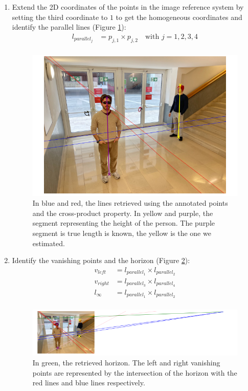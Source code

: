 \begin{enumerate}
    
    \item Extend the 2D coordinates of the points in the image reference system by setting the third coordinate to $1$ to get the homogeneous coordinates and identify the parallel lines (Figure \ref{fig:retrieved_lines}):
    \begin{align*}
        l_{parallel_j} &= p_{j,1} \times p_{j,2} \quad \text{with }j=1,2,3,4\\
    \end{align*}

\begin{figure}
    \centering
    \includegraphics[width=0.5\linewidth]{img/retrieved_lines.png}
    \caption{In blue and red, the lines retrieved using the annotated points and the cross-product property. In yellow and purple, the segment representing the height of the person. The purple segment is true length is known, the yellow is the one we estimated.}
    \label{fig:retrieved_lines}
\end{figure}
    
    \item Identify the vanishing points and the horizon (Figure \ref{fig:wide}):
    \begin{align*}
        v_{left} &= l_{parallel_1} \times l_{parallel_2}\\
        v_{right} &= l_{parallel_3} \times l_{parallel_4}\\
        l_{\infty} &= l_{parallel_1} \times l_{parallel_2}\\
    \end{align*}

\begin{figure}
    \centering
    \includegraphics[width=0.6\linewidth]{img/wide.png}
    \caption{In green, the retrieved horizon. The left and right vanishing points are represented by the intersection of the horizon with the red lines and blue lines respectively.}
    \label{fig:wide}
\end{figure}


\end{enumerate}
